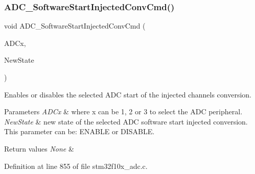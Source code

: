 \mbox{\label{group___a_d_c___exported___functions_ga5b141d5dbf5f417a11dfa622c8c149d3}} 
\subsubsection{\texorpdfstring{A\+D\+C\+\_\+\+Software\+Start\+Injected\+Conv\+Cmd()}{ADC\_SoftwareStartInjectedConvCmd()}}
{\footnotesize\ttfamily void A\+D\+C\+\_\+\+Software\+Start\+Injected\+Conv\+Cmd (\begin{DoxyParamCaption}\item[{\hyperlink{struct_a_d_c___type_def}{A\+D\+C\+\_\+\+Type\+Def} $\ast$}]{A\+D\+Cx,  }\item[{\hyperlink{group___exported__types_gac9a7e9a35d2513ec15c3b537aaa4fba1}{Functional\+State}}]{New\+State }\end{DoxyParamCaption})}



Enables or disables the selected A\+DC start of the injected channels conversion. 


\begin{DoxyParams}{Parameters}
{\em A\+D\+Cx} & where x can be 1, 2 or 3 to select the A\+DC peripheral. \\
\hline
{\em New\+State} & new state of the selected A\+DC software start injected conversion. This parameter can be\+: E\+N\+A\+B\+LE or D\+I\+S\+A\+B\+LE. \\
\hline
\end{DoxyParams}

\begin{DoxyRetVals}{Return values}
{\em None} & \\
\hline
\end{DoxyRetVals}


Definition at line 855 of file stm32f10x\+\_\+adc.\+c.

\mbox{\label{group___a_d_c___exported___functions_gadcba6341124a6aabfd2dd885ca8e5f14}} 
